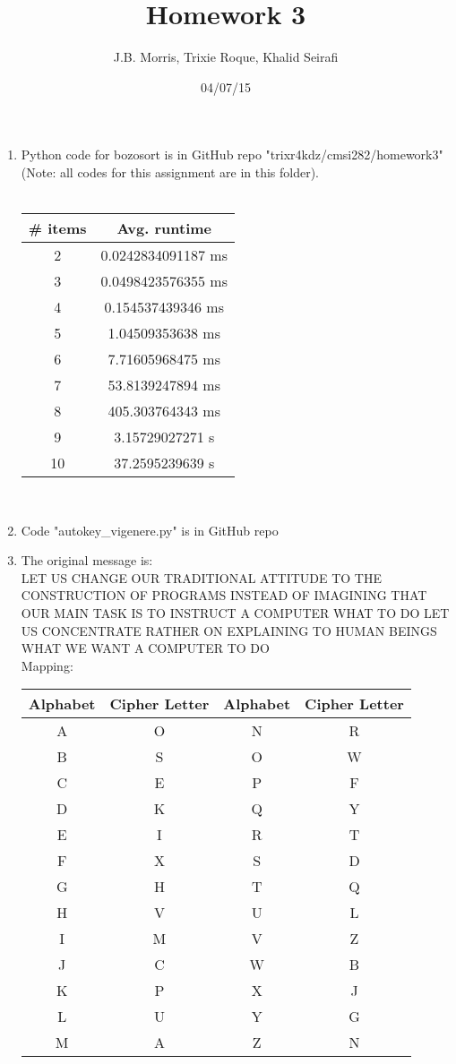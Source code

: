\documentclass{article}
\author{J.B. Morris, Trixie Roque, Khalid Seirafi}
\title{Homework 3}
\date{04/07/15}
\begin{document}
\maketitle

	\begin{enumerate}
		\item
			Python code for bozosort is in GitHub repo "trixr4kdz/cmsi282/homework3" (Note: all codes for this assignment are in this folder). \\
			\\
			\begin{tabular} {| c | c |}
				\hline
				\# items & Avg. runtime \\ \hline
				2 & 0.0242834091187 ms \\ \hline
				3 &  0.0498423576355 ms \\ \hline
				4 &  0.154537439346 ms \\ \hline
				5 & 1.04509353638 ms \\ \hline
				6 & 7.71605968475 ms \\ \hline
				7 & 53.8139247894 ms \\ \hline
				8 & 405.303764343 ms \\ \hline
				9 & 3.15729027271 s \\ \hline
				10 & 37.2595239639 s\\ \hline
			\end{tabular}
			\\
			
		\item
			Code "autokey\_vigenere.py" is in GitHub repo
			
		\item
			The original message is: \\
			LET US CHANGE OUR TRADITIONAL ATTITUDE TO THE CONSTRUCTION OF PROGRAMS INSTEAD OF IMAGINING THAT OUR MAIN TASK IS TO INSTRUCT A COMPUTER WHAT TO DO LET US CONCENTRATE RATHER ON EXPLAINING TO HUMAN BEINGS WHAT WE WANT A COMPUTER TO DO
			\\
			Mapping:
			\begin{tabular} {| c  c | c  c |}
				\hline
				Alphabet & Cipher Letter  & Alphabet & Cipher Letter \\ \hline
				A & O & N & R \\ \hline
				B & S & O & W \\ \hline
				C & E & P & F \\ \hline
				D & K & Q & Y \\ \hline
				E & I & R & T \\ \hline
				F & X & S & D \\ \hline
				G & H & T & Q \\ \hline
				H & V & U & L \\ \hline
				I & M & V & Z \\ \hline
				J & C & W & B \\ \hline
				K & P & X & J \\ \hline
				L & U & Y & G \\ \hline
				M & A & Z & N \\ \hline				
				\end{tabular}
				\\
		

\end{enumerate}
\end{document}
